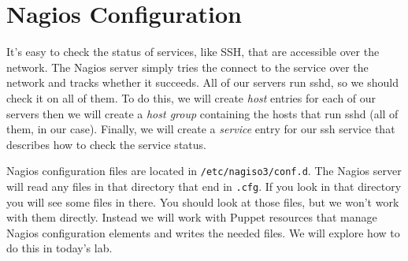 \documentclass{article}   	%
\begin{document}
\section{Nagios Configuration}

It's easy to check the status of services, like SSH, that are accessible over the network. The Nagios server simply tries the connect to the service over the network and tracks whether it succeeds. All of our servers run sshd, so we should check it on all of them. To do this, we will create \emph{host} entries for each of our servers then we will create a \emph{host group} containing the hosts that run sshd (all of them, in our case). Finally, we will create a \emph{service} entry for our ssh service that describes how to check the service status.

Nagios configuration files are located in \texttt{/etc/nagiso3/conf.d}. The Nagios server will read any files in that directory that end in \texttt{.cfg}. If you look in that directory you will see some files in there. You should look at those files, but we won't work with them directly. Instead we will work with Puppet resources that manage Nagios configuration elements and writes the needed files. We will explore how to do this in today's lab.



  
\end{document}
